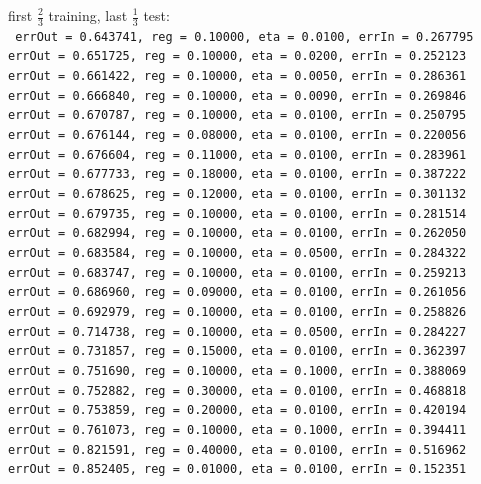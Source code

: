 \begin{appendices}
\noindent first $\frac{2}{3}$ training, last $\frac{1}{3}$ test: \\
\texttt{
  errOut = 0.643741, reg = 0.10000, eta = 0.0100, errIn = 0.267795 \\
  errOut = 0.651725, reg = 0.10000, eta = 0.0200, errIn = 0.252123 \\
  errOut = 0.661422, reg = 0.10000, eta = 0.0050, errIn = 0.286361 \\
  errOut = 0.666840, reg = 0.10000, eta = 0.0090, errIn = 0.269846 \\
  errOut = 0.670787, reg = 0.10000, eta = 0.0100, errIn = 0.250795 \\
  errOut = 0.676144, reg = 0.08000, eta = 0.0100, errIn = 0.220056 \\
  errOut = 0.676604, reg = 0.11000, eta = 0.0100, errIn = 0.283961 \\
  errOut = 0.677733, reg = 0.18000, eta = 0.0100, errIn = 0.387222 \\
  errOut = 0.678625, reg = 0.12000, eta = 0.0100, errIn = 0.301132 \\
  errOut = 0.679735, reg = 0.10000, eta = 0.0100, errIn = 0.281514 \\
  errOut = 0.682994, reg = 0.10000, eta = 0.0100, errIn = 0.262050 \\
  errOut = 0.683584, reg = 0.10000, eta = 0.0500, errIn = 0.284322 \\
  errOut = 0.683747, reg = 0.10000, eta = 0.0100, errIn = 0.259213 \\
  errOut = 0.686960, reg = 0.09000, eta = 0.0100, errIn = 0.261056 \\
  errOut = 0.692979, reg = 0.10000, eta = 0.0100, errIn = 0.258826 \\
  errOut = 0.714738, reg = 0.10000, eta = 0.0500, errIn = 0.284227 \\
  errOut = 0.731857, reg = 0.15000, eta = 0.0100, errIn = 0.362397 \\
  errOut = 0.751690, reg = 0.10000, eta = 0.1000, errIn = 0.388069 \\
  errOut = 0.752882, reg = 0.30000, eta = 0.0100, errIn = 0.468818 \\
  errOut = 0.753859, reg = 0.20000, eta = 0.0100, errIn = 0.420194 \\
  errOut = 0.761073, reg = 0.10000, eta = 0.1000, errIn = 0.394411 \\
  errOut = 0.821591, reg = 0.40000, eta = 0.0100, errIn = 0.516962 \\
  errOut = 0.852405, reg = 0.01000, eta = 0.0100, errIn = 0.152351 \\
}
\end{appendices}
